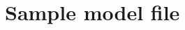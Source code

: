 \chapter{Sample model file}
\label{sec:crava-model-file}

\vspace{-2em}

\begin{small}

\end{small}
